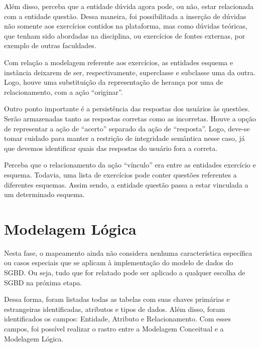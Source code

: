 \documentclass[graduacao,brazil]{ThesisPUC}
\begin{document}
Al\'{e}m disso, perceba que a entidade d\'{u}vida agora pode, ou n\~{a}o, estar relacionada com a
entidade quest\~{a}o. Dessa maneira, foi possibilitada a inser\c{c}\~{a}o de d\'{u}vidas n\~{a}o somente aos
exerc\'{i}cios contidos na plataforma, mas como d\'{u}vidas te\'{o}ricas, que tenham sido abordadas na
disciplina, ou exerc\'{i}cios de fontes externas, por exemplo de outras faculdades.

Com rela\c{c}\~{a}o a modelagem referente aos exerc\'{i}cios, as entidades esquema e inst\^{a}ncia
deixarem de ser, respectivamente, superclasse e subclasse uma da outra. Logo, houve uma
substitui\c{c}\~{a}o da representa\c{c}\~{a}o de heran\c{c}a por uma de relacionamento, com a a\c{c}\~{a}o “originar”.

Outro ponto importante \'{e} a persist\^{e}ncia das respostas dos usu\'{a}rios \`{a}s quest\~{o}es. Ser\~{a}o
armazenadas tanto as respostas corretas como as incorretas. Houve a op\c{c}\~{a}o de representar a
a\c{c}\~{a}o de “acerto” separado da a\c{c}\~{a}o de “resposta”. Logo, deve-se tomar cuidado para manter a
restri\c{c}\~{a}o de integridade sem\^{a}ntica nesse caso, j\'{a} que devemos identificar quais das respostas do
usu\'{a}rio fora a correta.

Perceba que o relacionamento da a\c{c}\~{a}o “v\'{i}nculo” era entre as entidades exerc\'{i}cio e
esquema. Todavia, uma lista de exerc\'{i}cios pode conter quest\~{o}es referentes a diferentes
esquemas. Assim sendo, a entidade quest\~{a}o passa a estar vinculada a um determinado esquema.


\section{Modelagem L\'{o}gica}

Nesta fase, o mapeamento ainda n\~{a}o considera nenhuma caracter\'{i}stica espec\'{i}fica ou
casos especiais que se aplicam \`{a} implementa\c{c}\~{a}o do modelo de dados do SGBD. Ou seja, tudo
que for relatado pode ser aplicado a qualquer escolha de SGBD na pr\'{o}xima etapa.

Dessa forma, foram listadas todas as tabelas com suas chaves prim\'{a}rias e estrangeiras
identificadas, atributos e tipos de dados. Al\'{e}m disso, foram identificados os campos: Entidade,
Atributo e Relacionamento. Com esses campos, foi poss\'{i}vel realizar o rastro entre a Modelagem
Conceitual e a Modelagem L\'{o}gica.
\end{document}
